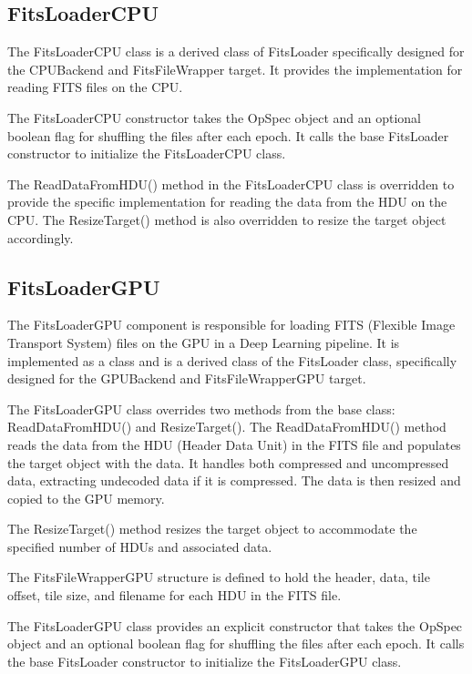 \documentclass[licencjacka,en]{pracamgr}
\begin{document}
\subsection{FitsLoaderCPU}

The FitsLoaderCPU class is a derived class of FitsLoader specifically designed for the CPUBackend and FitsFileWrapper target. It provides the implementation for reading FITS files on the CPU.

The FitsLoaderCPU constructor takes the OpSpec object and an optional boolean flag for shuffling the files after each epoch. It calls the base FitsLoader constructor to initialize the FitsLoaderCPU class.

The ReadDataFromHDU() method in the FitsLoaderCPU class is overridden to provide the specific implementation for reading the data from the HDU on the CPU. The ResizeTarget() method is also overridden to resize the target object accordingly.

\subsection{FitsLoaderGPU}


The FitsLoaderGPU component is responsible for loading FITS (Flexible Image Transport System) files on the GPU in a Deep Learning pipeline. It is implemented as a class and is a derived class of the FitsLoader class, specifically designed for the GPUBackend and FitsFileWrapperGPU target.

The FitsLoaderGPU class overrides two methods from the base class: ReadDataFromHDU() and ResizeTarget(). The ReadDataFromHDU() method reads the data from the HDU (Header Data Unit) in the FITS file and populates the target object with the data. It handles both compressed and uncompressed data, extracting undecoded data if it is compressed. The data is then resized and copied to the GPU memory.

The ResizeTarget() method resizes the target object to accommodate the specified number of HDUs and associated data.

The FitsFileWrapperGPU structure is defined to hold the header, data, tile offset, tile size, and filename for each HDU in the FITS file.

The FitsLoaderGPU class provides an explicit constructor that takes the OpSpec object and an optional boolean flag for shuffling the files after each epoch. It calls the base FitsLoader constructor to initialize the FitsLoaderGPU class.
\end{document}

